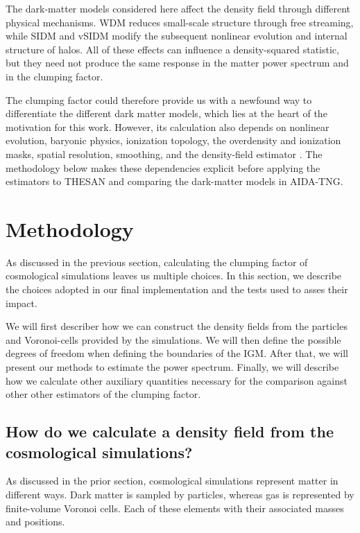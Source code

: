 \documentclass[%
 reprint,
nofootinbib,
 amsmath,amssymb,
 aps,
]{revtex4-2}
\begin{document}
The dark-matter models considered here affect the density field through different physical mechanisms. WDM reduces small-scale structure through free streaming, while SIDM and vSIDM modify the subsequent nonlinear evolution and internal structure of halos. All of these effects can influence a density-squared statistic, but they need not produce the same response in the matter power spectrum and in the clumping factor.

The clumping factor could therefore provide us with a newfound way to differentiate the different dark matter models, which lies at the heart of the motivation for this work. However, its calculation also depends on nonlinear evolution, baryonic physics, ionization topology, the overdensity and ionization masks, spatial resolution, smoothing, and the density-field estimator \cite{tulin2018sidm,marsh2021ultralight}. The methodology below makes these dependencies explicit before applying the estimators to THESAN and comparing the dark-matter models in AIDA-TNG.


\section{Methodology}

As discussed in the previous section, calculating the clumping factor of cosmological simulations leaves us multiple choices. In this section, we describe the choices adopted in our final implementation and the tests used to asses their impact. 

We will first describer how we can construct the density fields from the particles and Voronoi-cells provided by the simulations. We will then define the possible degrees of freedom when defining the boundaries of the IGM. After that, we will present our methods to estimate the power spectrum. Finally, we will describe how we calculate other auxiliary quantities necessary for the comparison against other other estimators of the clumping factor. 

\subsection{How do we calculate a density field from the cosmological simulations?}
As discussed in the prior section, cosmological simulations represent matter in different ways. Dark matter is sampled by particles, whereas gas is represented by finite-volume Voronoi cells. Each of these elements with their associated masses and positions. 
\end{document}
